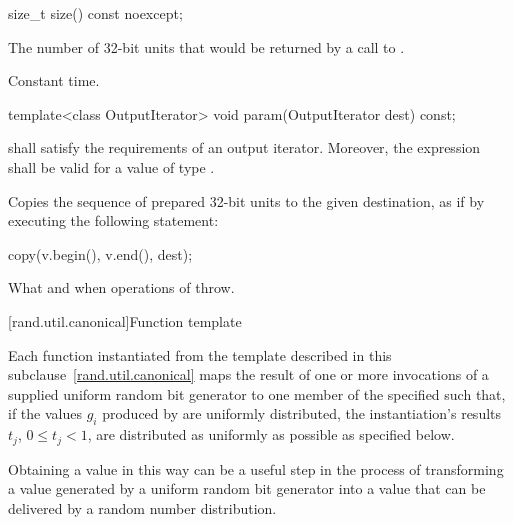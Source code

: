 %
\begin{itemdecl}
size_t size() const noexcept;
\end{itemdecl}

\begin{itemdescr}
\pnum\returns The number of 32-bit units
 that would be returned
 by a call to .

\pnum\complexity Constant time.
\end{itemdescr}

%
\begin{itemdecl}
template<class OutputIterator>
  void param(OutputIterator dest) const;
\end{itemdecl}

\begin{itemdescr}
\pnum\requires
   shall satisfy the requirements
  of an output iterator.
  Moreover,
  the expression
  shall be valid for a value  of type .

\pnum\effects Copies the sequence of prepared 32-bit units
 to the given destination,
 as if by executing the following statement:
\begin{codeblock}
copy(v.begin(), v.end(), dest);
\end{codeblock}

\pnum\throws
What and when  operations of  throw.
\end{itemdescr}


[rand.util.canonical]{Function template }%
%

\pnum
 Each function instantiated
 from the template
 described in this subclause~\ref{rand.util.canonical}
 maps the result of one or more invocations
 of a supplied uniform random bit generator 
 to one member
 of the specified 
 such that,
 if the values $g_i$
 produced by 
 are uniformly distributed,
 the instantiation's results
 $t_j$, $0 \leq t_j < 1$,
 are distributed as uniformly as possible
 as specified below.

\pnum
\begin{note}
 Obtaining a value in this way
 can be a useful step
 in the process of transforming
 a value generated by a uniform random bit generator
 into a value
 that can be delivered by a random number distribution.
\end{note}

